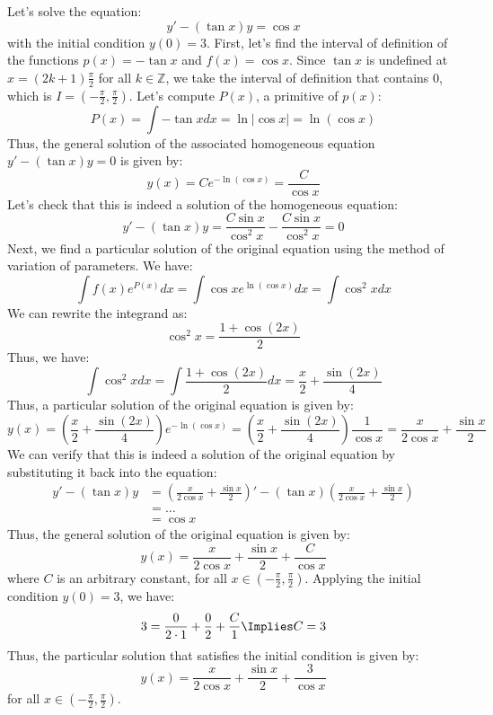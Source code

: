 \begin{eg}
    Let's solve the equation:
    \[
        y' - (\tan x)y = \cos x
    \]
    with the initial condition $y(0) = 3$. First, let's find the interval of definition of the functions $p(x) = -\tan x$ and $f(x) = \cos x$. Since $\tan x$ is undefined at $x = (2k + 1) \frac{\pi}{2}$ for all $k \in \mathbb{Z}$, we take the interval of definition that contains $0$, which is $I = \left(-\frac{\pi}{2}, \frac{\pi}{2}\right)$. Let's compute $P(x)$, a primitive of $p(x)$:
    \[
        P(x) = \int -\tan x dx = \ln |\cos x| = \ln (\cos x)
    \]
    Thus, the general solution of the associated homogeneous equation $y' - (\tan x) y = 0$ is given by:
    \[
        y(x) = Ce^{-\ln (\cos x)} = \frac{C}{\cos x}
    \]
    Let's check that this is indeed a solution of the homogeneous equation:
    \[
        y' - (\tan x) y = \frac{C \sin x}{\cos^2 x} - \frac{C \sin x}{\cos^2 x} = 0
    \]
    Next, we find a particular solution of the original equation using the method of variation of parameters. We have:
    \[
        \int f(x) e^{P(x)} dx = \int \cos x e^{\ln (\cos x)} dx = \int \cos^2 x dx
    \]
    We can rewrite the integrand as:
    \[
        \cos^2 x = \frac{1 + \cos (2x)}{2}
    \]
    Thus, we have:
    \[
        \int \cos^2 x dx = \int \frac{1 + \cos (2x)}{2} dx = \frac{x}{2} + \frac{\sin (2x)}{4}
    \]
    Thus, a particular solution of the original equation is given by:
    \[
        y(x) = \left(\frac{x}{2} + \frac{\sin (2x)}{4}\right) e^{-\ln (\cos x)} = \left(\frac{x}{2} + \frac{\sin (2x)}{4}\right) \frac{1}{\cos x} = \frac{x}{2 \cos x} + \frac{\sin x}{2}
    \]
    We can verify that this is indeed a solution of the original equation by substituting it back into the equation:
    \begin{align*}
        y' - (\tan x) y & = \left(\frac{x}{2 \cos x} + \frac{\sin x}{2}\right)' - (\tan x) \left(\frac{x}{2 \cos x} + \frac{\sin x}{2}\right) \\
        & = \ldots \\
        & = \cos x
    \end{align*}
    Thus, the general solution of the original equation is given by:
    \[
        y(x) = \frac{x}{2 \cos x} + \frac{\sin x}{2} + \frac{C}{\cos x}
    \]
    where $C$ is an arbitrary constant, for all $x \in \left(-\frac{\pi}{2}, \frac{\pi}{2}\right)$. Applying the initial condition $y(0) = 3$, we have:
    \[
        3 = \frac{0}{2 \cdot 1} + \frac{0}{2} + \frac{C}{1} \Implies C = 3
    \]
    Thus, the particular solution that satisfies the initial condition is given by:
    \[
        y(x) = \frac{x}{2 \cos x} + \frac{\sin x}{2} + \frac{3}{\cos x}
    \]
    for all $x \in \left(-\frac{\pi}{2}, \frac{\pi}{2}\right)$.
\end{eg}

